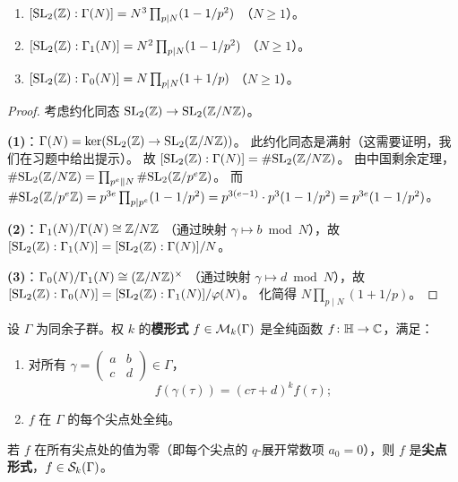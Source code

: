 \begin{proposition}[指标公式]
\label{prop:index-formulas}
\leavevmode
\begin{enumerate}
  \item $[\mathrm{SL}_2(\mathbb{Z}) : \Gamma(N)] = N^3 \prod_{p \mid N}(1 - 1/p^2)$
    （$N \geq 1$）。
  \item $[\mathrm{SL}_2(\mathbb{Z}) : \Gamma_1(N)] = N^2 \prod_{p \mid N}(1 - 1/p^2)$
    （$N \geq 1$）。
  \item $[\mathrm{SL}_2(\mathbb{Z}) : \Gamma_0(N)] = N \prod_{p \mid N}(1 + 1/p)$
    （$N \geq 1$）。
\end{enumerate}
\end{proposition}

\begin{proof}
考虑约化同态 $\mathrm{SL}_2(\mathbb{Z}) \to \mathrm{SL}_2(\mathbb{Z}/N\mathbb{Z})$。

\textbf{(1)}：$\Gamma(N) = \ker(\mathrm{SL}_2(\mathbb{Z}) \to \mathrm{SL}_2(\mathbb{Z}/N\mathbb{Z}))$。
此约化同态是满射（这需要证明，我们在习题中给出提示）。
故 $[\mathrm{SL}_2(\mathbb{Z}) : \Gamma(N)] = \#\mathrm{SL}_2(\mathbb{Z}/N\mathbb{Z})$。
由中国剩余定理，$\#\mathrm{SL}_2(\mathbb{Z}/N\mathbb{Z}) = \prod_{p^e \| N} \#\mathrm{SL}_2(\mathbb{Z}/p^e\mathbb{Z})$。
而 $\#\mathrm{SL}_2(\mathbb{Z}/p^e\mathbb{Z}) = p^{3e} \prod_{p \mid p^e}(1 - 1/p^2)
= p^{3(e-1)} \cdot p^3(1 - 1/p^2) = p^{3e}(1 - 1/p^2)$。

\textbf{(2)}：$\Gamma_1(N)/\Gamma(N) \cong \mathbb{Z}/N\mathbb{Z}$
（通过映射 $\gamma \mapsto b \bmod N$），故
$[\mathrm{SL}_2(\mathbb{Z}) : \Gamma_1(N)] = [\mathrm{SL}_2(\mathbb{Z}) : \Gamma(N)]/N$。

\textbf{(3)}：$\Gamma_0(N)/\Gamma_1(N) \cong (\mathbb{Z}/N\mathbb{Z})^\times$
（通过映射 $\gamma \mapsto d \bmod N$），故
$[\mathrm{SL}_2(\mathbb{Z}) : \Gamma_0(N)] = [\mathrm{SL}_2(\mathbb{Z}) : \Gamma_1(N)]/\varphi(N)$。
化简得 $N \prod_{p \mid N}(1 + 1/p)$。
\end{proof}

\begin{definition}[同余子群上的模形式]
\label{def:modular-forms-congruence}
设 $\Gamma$ 为同余子群。权 $k$ 的\textbf{模形式} $f \in \mathcal{M}_k(\Gamma)$
是全纯函数 $f\colon \mathbb{H} \to \mathbb{C}$，满足：
\begin{enumerate}
  \item 对所有 $\gamma = \begin{pmatrix} a & b \\ c & d \end{pmatrix}
    \in \Gamma$，
    \[
      f(\gamma(\tau)) = (c\tau + d)^k f(\tau);
    \]
  \item $f$ 在 $\Gamma$ 的每个尖点处全纯。
\end{enumerate}
若 $f$ 在所有尖点处的值为零（即每个尖点的 $q$-展开常数项 $a_0 = 0$），则 $f$ 是\textbf{尖点形式}，$f \in \mathcal{S}_k(\Gamma)$。
\end{definition}


